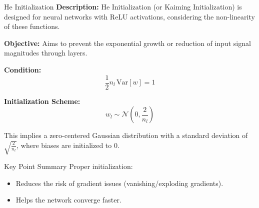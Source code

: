 \documentclass[serif, aspectratio=169]{beamer}
\begin{document}
\begin{frame}{He Initialization}
    \textbf{Description:} 
    He Initialization (or Kaiming Initialization) is designed for neural networks with ReLU activations, considering the non-linearity of these functions.
    
    \textbf{Objective:} 
    Aims to prevent the exponential growth or reduction of input signal magnitudes through layers.

    \textbf{Condition:}
    \[
    \frac{1}{2} n_l \, \text{Var}[w] = 1
    \]
    
    \textbf{Initialization Scheme:}
    \[
    w_l \sim \mathcal{N}\left(0, \frac{2}{n_l}\right)
    \]
    
    This implies a zero-centered Gaussian distribution with a standard deviation of \( \sqrt{\frac{2}{n_l}} \), where biases are initialized to 0.
\end{frame}

\begin{frame}{Key Point Summary}
    Proper initialization:
    \begin{itemize}
        \item Reduces the risk of gradient issues (vanishing/exploding gradients).
        \item Helps the network converge faster.
    \end{itemize}
\end{frame}
\end{document}
